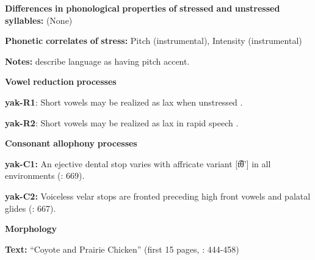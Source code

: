 \begin{styleBody}
\textbf{Differences} \textbf{in} \textbf{phonological} \textbf{properties} \textbf{of} \textbf{stressed} \textbf{and} \textbf{unstressed} \textbf{syllables:} (None)
\end{styleBody}

\begin{styleBody}
\textbf{Phonetic} \textbf{correlates} \textbf{of} \textbf{stress:} Pitch (instrumental), Intensity (instrumental)
\end{styleBody}

\begin{styleBody}
\textbf{Notes:} \citet{HargusBeavert2005} describe language as having pitch accent.
\end{styleBody}

\begin{styleBody}
\textbf{Vowel} \textbf{reduction} \textbf{processes}
\end{styleBody}

\begin{styleBody}
\textbf{yak-R1}: Short vowels may be realized as lax when unstressed \citep[40]{Jansen2010}.
\end{styleBody}

\begin{styleBody}
\textbf{yak-R2}: Short vowels may be realized as lax in rapid speech \citep[40]{Jansen2010}.
\end{styleBody}

\begin{styleBody}
\textbf{Consonant} \textbf{allophony} \textbf{processes}
\end{styleBody}

\begin{styleBody}
\textbf{yak-C1:} An ejective dental stop varies with affricate variant [t͡θ’] in all environments (\citealt{RigsbyRude1996}: 669).
\end{styleBody}

\begin{styleBody}
\textbf{yak-C2:} Voiceless velar stops are fronted preceding high front vowels and palatal glides (\citealt{RigsbyRude1996}: 667).
\end{styleBody}

\begin{styleBody}
\textbf{Morphology}
\end{styleBody}

\begin{styleBody}
\textbf{Text:} “Coyote and Prairie Chicken” (first 15 pages, \citealt{Jansen2010}: 444-458)
\end{styleBody}

